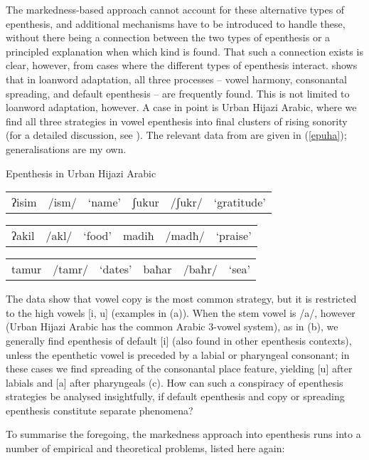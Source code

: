 \documentclass[output=paper,colorlinks,citecolor=brown]{langscibook}
\begin{document}
The markedness-based approach cannot account for these alternative types of epenthesis, and additional mechanisms have to be introduced to handle these, without there being a connection between the two types of epenthesis or a principled explanation when which kind is found. That such a connection exists is clear, however, from cases where the different types of epenthesis interact. \citet{uffbook, uff06} shows that in loanword adaptation, all three processes -- vowel harmony, consonantal spreading, and default epenthesis -- are frequently found. This is not limited to loanword adaptation, however. A case in point is Urban Hijazi Arabic, where we find all three strategies in vowel epenthesis into final clusters of rising sonority (for a detailed discussion, see ). The relevant data from \citet{almohanna21} are given in (\ref{epuha}); generalisations are my own.

\ea Epenthesis in Urban Hijazi Arabic \citep{almohanna21}
\label{epuha}
\ea \begin{tabular}{p{1cm}p{1cm}p{2cm}p{1cm}p{1cm}l}
{}ʔisim & /ism/  & `name'    &ʃukur & /ʃukr/& `gratitude'
\end{tabular}
\ex \begin{tabular}{p{1cm}p{1cm}p{2cm}p{1cm}p{1cm}l}
{}ʔakil   & /akl/& `food'    &madiħ &/madħ/ & `praise'
\end{tabular}
\ex \begin{tabular}{p{1cm}p{1cm}p{2cm}p{1cm}p{1cm}l}
{} tamur   &/tamr/& `dates'    &baħar &/baħr/ &`sea'
\end{tabular}
\z 
\z

The data show that vowel copy is the most common strategy, but it is restricted to the high vowels [i, u] (examples in (a)). When the stem vowel is /a/, however (Urban Hijazi Arabic has the common Arabic 3-vowel system), as in (b), we generally find epenthesis of default [i] (also found in other epenthesis contexts), unless the epenthetic vowel is preceded by a labial or pharyngeal consonant; in these cases we find spreading of the consonantal place feature, yielding [u] after labials and [a] after pharyngeals (c). How can such a conspiracy of epenthesis strategies be analysed insightfully, if default epenthesis and copy or spreading epenthesis constitute separate phenomena?

To summarise the foregoing, the markedness approach into epenthesis runs into a number of empirical and theoretical problems, listed here again:
\end{document}
